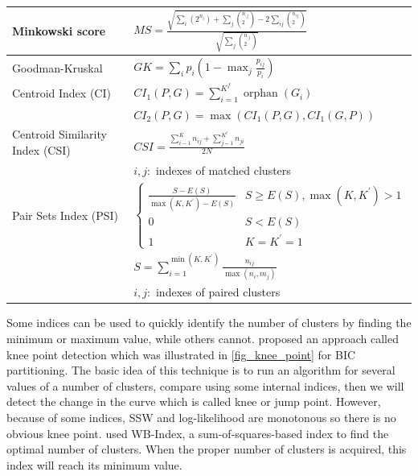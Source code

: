 \documentclass[a4paper, 12pt]{article}
\begin{document}
\begin{table}[ht!]
{\begin{tabular}{|l|l|}
            \hline Minkowski score & $M S=\frac{\sqrt{\sum_{i}\left(2^{n_{i}}\right)+\sum_{j}\left({ }_{2}^{n_{. j}}\right)-2 \sum_{i j}\left({ }_{2}^{n_{i j}}\right)}}{\sqrt{\sum_{j}\left({ }_{2}^{n_{. j}}\right)}}$ \\
            \hline Goodman-Kruskal & $G K=\sum_{i} p_{i}\left(1-\max _{j} \frac{p_{i j}}{p_{i}}\right)$ \\
            \hline Centroid Index (CI) \citep{franti2014centroid} & $C I_{1}(P, G)=\sum_{i=1}^{K^{f}} \operatorname{orphan}\left(G_{i}\right)$ \\
            & $C I_{2}(P, G)=\max \left(C I_{1}(P, G), C I_{1}(G, P)\right)$ \\
            \hline Centroid Similarity Index (CSI) \citep{franti2014centroid} & $C S I=\frac{\sum_{i-1}^{K} n_{i j}+\sum_{j-1}^{K^{t}} n_{j i}}{2 N}$ \\
            & $i, j:$ indexes of matched clusters \\
            \hline Pair Sets Index (PSI) \citep{rezaei2016set} & $\left\{\begin{array}{cc}\frac{S-E(S)}{\max \left(K, K^{\prime}\right)-E(S)} & S \geq E(S), \max \left(K, K^{\prime}\right)>1 \\ 0 & S<E(S) \\ 1 & K=K^{\prime}=1\end{array}\right.$ \\
            & $S=\sum_{i=1}^{\min \left(K, K^{\prime}\right)} \frac{n_{i j}}{\max \left(n_{i}, m_{j}\right)}$ \\
            & $i, j:$ indexes of paired clusters \\
            \hline
        \end{tabular}
    }
    \label{table:2}
\end{table}

Some indices can be used to quickly identify the number of clusters by finding the minimum or maximum value, while others cannot. \citet{zhao2008knee} proposed an approach called knee point detection which was illustrated in \autoref{fig_knee_point} for BIC partitioning. The basic idea of this technique is to run an algorithm for several values of a number of clusters, compare using some internal indices, then we will detect the change in the curve which is called knee or jump point. However, because of some indices, SSW and log-likelihood are monotonous so there is no obvious knee point. \citet{zhao2014wb} used WB-Index, a sum-of-squares-based index \citep{zhao2009sum} to find the optimal number of clusters. When the proper number of clusters is acquired, this index will reach its minimum value.
\end{document}
